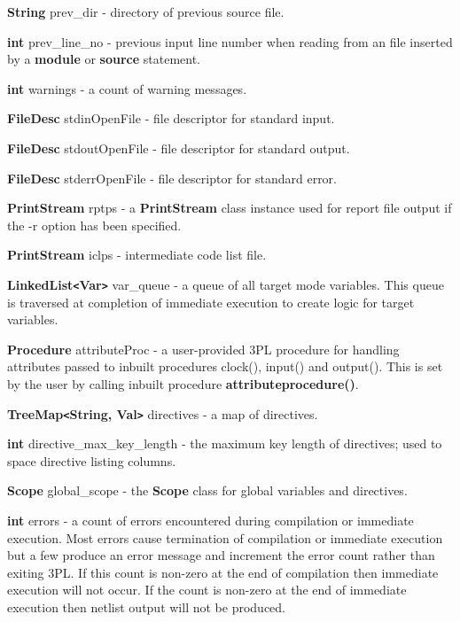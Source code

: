 \documentclass[10pt,a4paper,twoside,fleqn]{book}
\begin{document}
            {\bf String} prev\_dir - directory of previous source file.

            {\bf int} prev\_line\_no -  previous input line number
            when reading from an file inserted by a {\bf module} or {\bf source}
            statement.

            {\bf int} warnings - a count of warning messages.

            {\bf FileDesc} stdinOpenFile - file descriptor for standard input.
            
            {\bf FileDesc} stdoutOpenFile - file descriptor for standard output.

            {\bf FileDesc} stderrOpenFile - file descriptor for standard error.

            {\bf PrintStream} rptps -  a {\bf PrintStream} class
            instance used for report file output if the -r option has been specified.

            {\bf PrintStream} iclps - intermediate code list file.

            {\bf LinkedList\verb'<'Var\verb'>'} var\_queue -  a queue of
            all target mode variables. This queue is traversed at completion of immediate
            execution to create logic for target variables.
            
            {\bf Procedure} attributeProc - a user-provided 3PL procedure for
            handling attributes passed to inbuilt procedures clock(), input() and
            output(). This is set by the user by calling inbuilt procedure {\bf
            attributeprocedure()}.

            {\bf TreeMap\verb'<'String, Val\verb'>'} directives - a map of directives.

            {\bf int} directive\_max\_key\_length - the maximum key length of directives; used to
            space directive listing columns.

            {\bf Scope} global\_scope -  the {\bf Scope} class
            for global variables and directives.

            {\bf int} errors - a count of errors encountered during
            compilation or immediate execution. Most errors cause termination of
            compilation or immediate execution but a few produce an error message
            and increment the error count rather than exiting 3PL. If this count is
            non-zero at the end of compilation then immediate execution will not
            occur. If the count is non-zero at the end of immediate execution then
            netlist output will not be produced.
\end{document}
